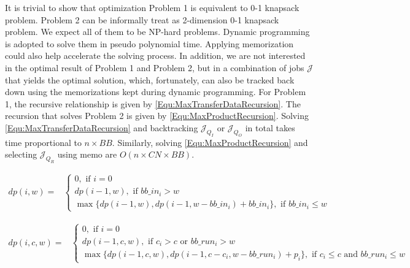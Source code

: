 It is trivial to show that optimization Problem 1
is equivalent to 0-1 knapsack problem.
Problem 2 can be informally treat as 2-dimension 0-1 knapsack problem.
We expect all of them to be NP-hard problems.
Dynamic programming is adopted to solve them in pseudo polynomial time.
Applying memorization could also help accelerate the solving process.
In addition, we are not interested in the optimal result of
Problem 1 and Problem 2,
but in a combination of jobs $\mathcal{J}$ that yields the optimal solution,
which, fortunately, can also be tracked back down
using the memorizations kept during dynamic programming.
For Problem 1, the recursive relationship is
given by \ref{Equ:MaxTransferDataRecursion}.
The recursion that solves Problem 2 is given by \ref{Equ:MaxProductRecursion}.
Solving \ref{Equ:MaxTransferDataRecursion} and
backtracking $\mathcal{J}_{Q_I}$ or $\mathcal{J}_{Q_O}$ in total takes time proportional to $n\times BB$.
Similarly, solving \ref{Equ:MaxProductRecursion} and selecting $\mathcal{J}_{Q_R}$ using memo
are $O(n\times CN\times BB)$.

\begin{strip}
        \begin{align}
                dp(i, w) = & 
                \left\{
                        \begin{array}{l}
                                0, \text{ if $i=0$ } \\ [0.4em]
                                dp(i-1, w), \text{ if $bb\_in_i > w$} \\ [0.4em]
                                \max \{ dp(i-1, w), dp(i-1, w-bb\_in_i) + bb\_in_i \}, \text{ if $bb\_in_i \leq w$}
                        \end{array} 
                \right.
                \label{Equ:MaxTransferDataRecursion} 
        \end{align}
\end{strip}

\begin{strip}
        \begin{align}
                dp(i, c, w) = &
                \left\{
                        \begin{array}{l}
                                0, \text{ if $i=0$ } \\ [0.4em]
                                dp(i-1, c, w), \text{ if $c_i > c$ or $bb\_run_i > w$} \\ [0.4em]
                                \max \{ dp(i-1, c, w), dp(i-1, c - c_i, w - bb\_run_i) + p_i \}, \text{ if $c_i \leq c$ and $bb\_run_i \leq w$}
                        \end{array} 
                \right.
                \label{Equ:MaxProductRecursion}
        \end{align}
\end{strip}


